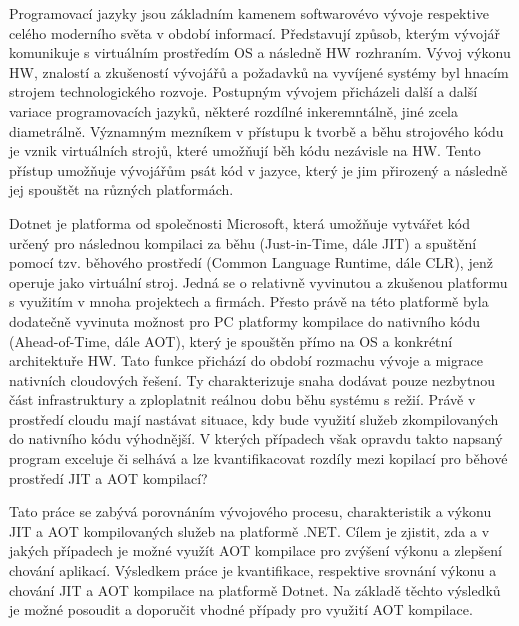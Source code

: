 Programovací jazyky jsou základním kamenem softwarovévo vývoje respektive celého moderního světa v období informací. Představují způsob, kterým vývojář komunikuje s virtuálním prostředím OS a následně HW rozhraním. Vývoj výkonu HW, znalostí a zkušeností vývojářů a požadavků na vyvíjené systémy byl hnacím strojem technologického rozvoje. Postupným vývojem přicházeli další a další variace programovacích jazyků, některé rozdílné inkeremntálně, jiné zcela diametrálně. Významným mezníkem v přístupu k tvorbě a běhu strojového kódu je vznik virtuálních strojů, které umožňují běh kódu nezávisle na HW. Tento přístup umožňuje vývojářům psát kód v jazyce, který je jim přirozený a následně jej spouštět na různých platformách.

Dotnet je platforma od společnosti Microsoft, která umožňuje vytvářet kód určený pro následnou kompilaci za běhu (Just-in-Time, dále JIT) a spuštění pomocí tzv. běhového prostředí (Common Language Runtime, dále CLR), jenž operuje jako virtuální stroj. Jedná se o relativně vyvinutou a zkušenou platformu s využitím v mnoha projektech a firmách. Přesto právě na této platformě byla dodatečně vyvinuta možnost pro PC platformy kompilace do nativního kódu (Ahead-of-Time, dále AOT), který je spouštěn přímo na OS a konkrétní architektuře HW. Tato funkce přichází do období rozmachu vývoje a migrace nativních cloudových řešení. Ty charakterizuje snaha dodávat pouze nezbytnou část infrastruktury a zploplatnit reálnou dobu běhu systému s režií. Právě v prostředí cloudu mají nastávat situace, kdy bude využití služeb zkompilovaných do nativního kódu výhodnější. V kterých případech však opravdu takto napsaný program exceluje či selhává a lze kvantifikacovat rozdíly mezi kopilací pro běhové prostředí JIT a AOT kompilací?

Tato práce se zabývá porovnáním vývojového procesu, charakteristik a výkonu JIT a AOT kompilovaných služeb na platformě .NET. Cílem je zjistit, zda a v jakých případech je možné využít AOT kompilace pro zvýšení výkonu a zlepšení chování aplikací. Výsledkem práce je kvantifikace, respektive srovnání výkonu a chování JIT a AOT kompilace na platformě Dotnet. Na základě těchto výsledků je možné posoudit a doporučit vhodné případy pro využití AOT kompilace.